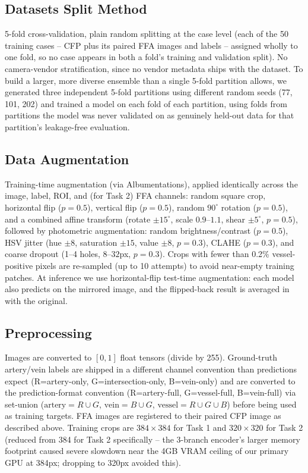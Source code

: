 \documentclass[runningheads]{llncs}
\begin{document}
\subsection{Datasets Split Method}
5-fold cross-validation, plain random splitting at the case level (each of
the 50 training cases -- CFP plus its paired FFA images and labels --
assigned wholly to one fold, so no case appears in both a fold's training
and validation split). No camera-vendor stratification, since no vendor
metadata ships with the dataset. To build a
larger, more diverse ensemble than a single 5-fold partition allows, we
generated three independent 5-fold partitions using different random seeds
(77, 101, 202) and trained a model on each fold of each partition, using
folds from partitions the model was never validated on as genuinely
held-out data for that partition's leakage-free evaluation.

\subsection{Data Augmentation}
Training-time augmentation (via Albumentations), applied identically across
the image, label, ROI, and (for Task 2) FFA channels: random square crop,
horizontal flip ($p{=}0.5$), vertical flip ($p{=}0.5$), random $90^\circ$
rotation ($p{=}0.5$), and a combined affine transform (rotate
$\pm15^\circ$, scale $0.9$--$1.1$, shear $\pm5^\circ$, $p{=}0.5$), followed
by photometric augmentation: random brightness/contrast ($p{=}0.5$),
HSV jitter (hue $\pm8$, saturation $\pm15$, value $\pm8$, $p{=}0.3$), CLAHE
($p{=}0.3$), and coarse dropout (1--4 holes, $8$--$32$px, $p{=}0.3$). Crops
with fewer than 0.2\% vessel-positive pixels are re-sampled (up to 10
attempts) to avoid near-empty training patches. At inference we use
horizontal-flip test-time augmentation: each model also predicts on the
mirrored image, and the flipped-back result is averaged in with the
original.

\subsection{Preprocessing}\label{sec:preprocessing}
Images are converted to $[0,1]$ float tensors (divide by 255). Ground-truth
artery/vein labels are shipped in a different channel convention than
predictions expect (R=artery-only, G=intersection-only, B=vein-only) and are
converted to the prediction-format convention (R=artery-full, G=vessel-full,
B=vein-full) via set-union ($\text{artery}=R\cup G$, $\text{vein}=B\cup G$,
$\text{vessel}=R\cup G\cup B$) before being used as training targets.
FFA images are registered to their paired CFP image as described above.
Training crops are $384\times384$ for Task 1 and $320\times320$ for Task 2
(reduced from 384 for Task 2 specifically -- the 3-branch encoder's larger
memory footprint caused severe slowdown near the 4GB VRAM ceiling of our
primary GPU at 384px; dropping to 320px avoided this).
\end{document}
